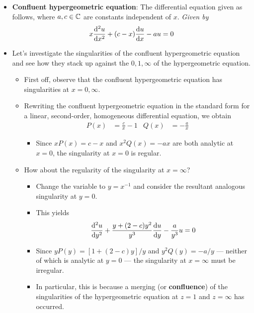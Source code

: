 \documentclass[../finalProject.tex]{subfiles}
\begin{document}
\begin{itemize}
\begin{itemize}
    \end{itemize}
    \item \textbf{Confluent hypergeometric equation}: The differential equation given as follows, where $a,c\in\mathbb{C}$ are constants independent of $x$. \emph{Given by}
    \begin{equation*}
        x\dv[2]{u}{x}+(c-x)\dv{u}{x}-au = 0
    \end{equation*}
    \item Let's investigate the singularities of the confluent hypergeometric equation and see how they stack up against the $0,1,\infty$ of the hypergeometric equation.
    \begin{itemize}
        \item First off, observe that the confluent hypergeometric equation has singularities at $x=0,\infty$.
        \item Rewriting the confluent hypergeometric equation in the standard form for a linear, second-order, homogeneous differential equation, we obtain
        \begin{align*}
            P(x) &= \frac{c}{x}-1&
            Q(x) &= -\frac{a}{x}
        \end{align*}
        \begin{itemize}
            \item Since $xP(x)=c-x$ and $x^2Q(x)=-ax$ are both analytic at $x=0$, the singularity at $x=0$ is regular.
        \end{itemize}
        \item How about the regularity of the singularity at $x=\infty$?
        \begin{itemize}
            \item Change the variable to $y=x^{-1}$ and consider the resultant analogous singularity at $y=0$.
            \item This yields
            \begin{equation*}
                \dv[2]{u}{y}+\frac{y+(2-c)y^2}{y^3}\dv{u}{y}-\frac{a}{y^3}u = 0
            \end{equation*}
            \item Since $yP(y)=[1+(2-c)y]/y$ and $y^2Q(y)=-a/y$ --- neither of which is analytic at $y=0$ --- the singularity at $x=\infty$ must be irregular.
            \item In particular, this is because a merging (or \textbf{confluence}) of the singularities of the hypergeometric equation at $z=1$ and $z=\infty$ has occurred.
        \end{itemize}

\end{itemize}
\end{itemize}
\end{document}
